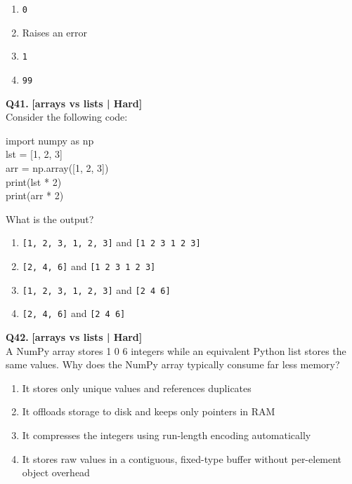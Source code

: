 \begin{enumerate}[label=(\alph*),topsep=2pt,itemsep=1pt,partopsep=0pt,parsep=0pt]
    \item \relax \texttt{0}
    \item \relax Raises an error
    \item \relax \texttt{1}
    \item \relax \texttt{99}
\end{enumerate}
\vspace{2mm}

\noindent\textbf{Q41.} \hfill {\small\color{LPUOrange}\textbf{[arrays vs lists | Hard]}}\\[2pt]
Consider the following code: 

\begin{pycode}
import numpy as np\\
lst = [1, 2, 3]\\
arr = np.array([1, 2, 3])\\
print(lst * 2)\\
print(arr * 2)
\end{pycode}

 What is the output?

\begin{enumerate}[label=(\alph*),topsep=2pt,itemsep=1pt,partopsep=0pt,parsep=0pt]
    \item \relax \texttt{[1, 2, 3, 1, 2, 3]} and \texttt{[1 2 3 1 2 3]}
    \item \relax \texttt{[2, 4, 6]} and \texttt{[1 2 3 1 2 3]}
    \item \relax \texttt{[1, 2, 3, 1, 2, 3]} and \texttt{[2 4 6]}
    \item \relax \texttt{[2, 4, 6]} and \texttt{[2 4 6]}
\end{enumerate}
\vspace{2mm}

\noindent\textbf{Q42.} \hfill {\small\color{LPUOrange}\textbf{[arrays vs lists | Hard]}}\\[2pt]
A NumPy array stores 1 0 6 integers while an equivalent Python list stores the same values. Why does the NumPy array typically consume far less memory?

\begin{enumerate}[label=(\alph*),topsep=2pt,itemsep=1pt,partopsep=0pt,parsep=0pt]
    \item \relax It stores only unique values and references duplicates
    \item \relax It offloads storage to disk and keeps only pointers in RAM
    \item \relax It compresses the integers using run-length encoding automatically
    \item \relax It stores raw values in a contiguous, fixed-type buffer without per-element object overhead
\end{enumerate}
\vspace{2mm}

